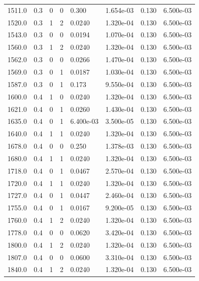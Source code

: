 \documentclass[preview]{standalone}
\begin{document}
{{{{\begin{tabular}{L{1.2cm}C{1.2cm} C{0.3cm}C{0.5cm} C{1.4cm}C{1.4cm} C{1.4cm}C{1.4cm}}
  1511.0  &   0.3  & 0     &  0 &  0.300  & 1.654e-03  & 0.130 &  6.500e-03   \\ 
  1520.0  &   0.3  & 1     &  2 &  0.0240  & 1.320e-04  & 0.130 &  6.500e-03   \\ 
  1543.0  &   0.3  & 0     &  0 &  0.0194  & 1.070e-04  & 0.130 &  6.500e-03   \\ 
  1560.0  &   0.3  & 1     &  2 &  0.0240  & 1.320e-04  & 0.130 &  6.500e-03   \\ 
  1562.0  &   0.3  & 0     &  0 &  0.0266  & 1.470e-04  & 0.130 &  6.500e-03   \\ 
  1569.0  &   0.3  & 0     &  1 &  0.0187  & 1.030e-04  & 0.130 &  6.500e-03   \\ 
  1587.0  &   0.3  & 0     &  1 &  0.173  & 9.550e-04  & 0.130 &  6.500e-03   \\ 
  1600.0  &   0.4  & 1     &  0 &  0.0240  & 1.320e-04  & 0.130 &  6.500e-03   \\ 
  1621.0  &   0.4  & 0     &  1 &  0.0260  & 1.430e-04  & 0.130 &  6.500e-03   \\ 
  1635.0  &   0.4  & 0     &  1 &  6.400e-03  & 3.500e-05  & 0.130 &  6.500e-03   \\ 
  1640.0  &   0.4  & 1     &  1 &  0.0240  & 1.320e-04  & 0.130 &  6.500e-03   \\ 
  1678.0  &   0.4  & 0     &  0 &  0.250  & 1.378e-03  & 0.130 &  6.500e-03   \\ 
  1680.0  &   0.4  & 1     &  1 &  0.0240  & 1.320e-04  & 0.130 &  6.500e-03   \\ 
  1718.0  &   0.4  & 0     &  1 &  0.0467  & 2.570e-04  & 0.130 &  6.500e-03   \\ 
  1720.0  &   0.4  & 1     &  1 &  0.0240  & 1.320e-04  & 0.130 &  6.500e-03   \\ 
  1727.0  &   0.4  & 0     &  1 &  0.0447  & 2.460e-04  & 0.130 &  6.500e-03   \\ 
  1755.0  &   0.4  & 0     &  1 &  0.0167  & 9.200e-05  & 0.130 &  6.500e-03   \\ 
  1760.0  &   0.4  & 1     &  2 &  0.0240  & 1.320e-04  & 0.130 &  6.500e-03   \\ 
  1778.0  &   0.4  & 0     &  0 &  0.0620  & 3.420e-04  & 0.130 &  6.500e-03   \\ 
  1800.0  &   0.4  & 1     &  2 &  0.0240  & 1.320e-04  & 0.130 &  6.500e-03   \\ 
  1807.0  &   0.4  & 0     &  0 &  0.0600  & 3.310e-04  & 0.130 &  6.500e-03   \\ 
  1840.0  &   0.4  & 1     &  2 &  0.0240  & 1.320e-04  & 0.130 &  6.500e-03   \\ 

\end{tabular}}}}}
\end{document}
